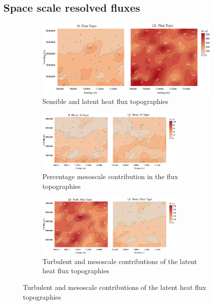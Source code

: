 \documentclass[draft]{agujournal2019}
\begin{document}
\subsection{Space scale resolved fluxes}
 \begin{figure}[hbtp]
     \begin{subfigure}{0.8\textwidth}
         \includegraphics[width=1\textwidth]{figures_main/topo_infi.eps}
         \caption{Sensible and latent heat flux topographies }
         \label{fig:topo_infi}
     \end{subfigure}
     \begin{subfigure}{\textwidth}
         \includegraphics[width=0.8\textwidth]{figures_main/topo_meso_perc.eps}
         \caption{Percentage mesoscale contribution in the flux topographies}
         \label{fig:topo_meso_perc}
     \end{subfigure}
     \begin{subfigure}{\textwidth}
         \includegraphics[width=0.8\textwidth]{figures_main/topo_LE_turb_meso.eps}
         \caption{Turbulent and mesoscale contributions of the latent heat flux topographies}

\end{subfigure}
\end{figure}
\end{document}
